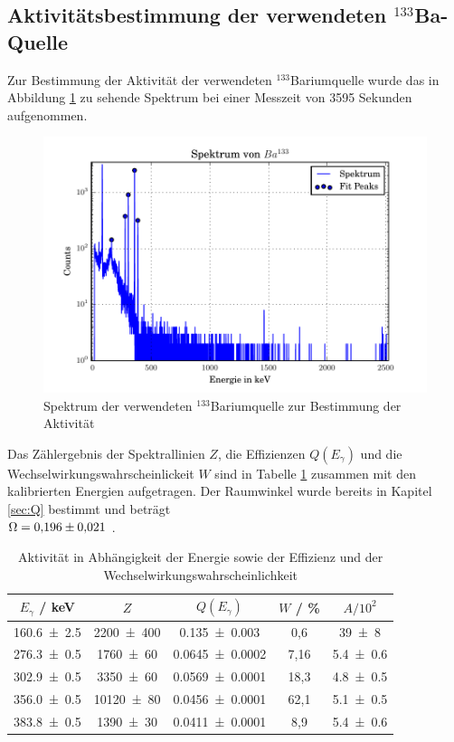 \subsection{Aktivitätsbestimmung der verwendeten $^{133}$Ba-Quelle}
Zur Bestimmung der Aktivität der verwendeten $^{133}$Bariumquelle wurde das in Abbildung \ref{fig:BA} zu sehende Spektrum bei einer Messzeit von 3595 Sekunden aufgenommen.
\begin{figure}[H]
  \centering
  \includegraphics[width=\textwidth]{./build/SpektBa.pdf}
  \caption{Spektrum der verwendeten $^{133}$Bariumquelle zur Bestimmung der Aktivität}
  \label{fig:BA}
\end{figure}
Das Zählergebnis der Spektrallinien $Z$, die Effizienzen $Q(E_\gamma)$ und die Wechselwirkungswahrscheinlickeit $W$ sind in Tabelle \ref{tab:Ba} zusammen mit den kalibrierten Energien aufgetragen. Der Raumwinkel wurde bereits in Kapitel \ref{sec:Q} bestimmt und beträgt \\
$\Omega = \num{0,196 +- 0,021}$ .
\begin{table}
  \centering
  \caption{Aktivität in Abhängigkeit der Energie sowie der Effizienz und der Wechselwirkungswahrscheinlichkeit}
  \begin{tabular}{c c c c c}
    \toprule
	$E_\gamma$ / keV & $Z$ & $Q(E_\gamma)$ & $W$ / \%  & $A / 10^2$\\
    \hline
    \num{160,6 +- 2,5}	& \num{2200 +- 400}	& \num{0,135 +-  0,003} 	& 0,6	& \num{39 +- 8}	\\
    \num{276,3 +- 0,5}  & \num{1760 +- 60}	& \num{0,0645 +- 0,0002} 	& 7,16 	& \num{5,4 +- 0,6}	\\
    \num{302,9 +- 0,5}	& \num{3350 +- 60} 	& \num{0,0569 +- 0,0001} 	& 18,3	& \num{4,8 +- 0,5} 	\\
    \num{356,0 +- 0,5}	& \num{10120 +-	80}	& \num{0,0456 +- 0,0001} 	& 62,1	& \num{5,1 +- 0,5}	\\
    \num{383,8 +- 0,5}	& \num{1390 +- 30}	& \num{0,0411 +- 0,0001} 	& 8,9	& \num{5,4 +- 0,6}	\\
    \bottomrule
  \end{tabular}
  \label{tab:Ba}
\end{table}
